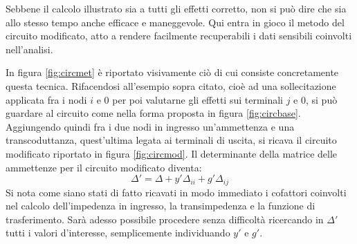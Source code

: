 Sebbene il calcolo illustrato sia a tutti gli effetti corretto, non si può dire che sia allo stesso tempo anche efficace e maneggevole. Qui entra in gioco il metodo del circuito modificato, atto a rendere facilmente recuperabili i dati sensibili coinvolti nell'analisi.

In figura \ref{fig:circmet} è riportato visivamente ciò di cui consiste concretamente questa tecnica. Rifacendosi all'esempio sopra citato, cioè ad una sollecitazione applicata fra i nodi $i$ e $0$ per poi valutarne gli effetti sui terminali $j$ e $0$, si può guardare al circuito come nella forma proposta in figura \ref{fig:circbase}. Aggiungendo quindi fra i due nodi in ingresso un'ammettenza e una transcoduttanza, quest'ultima legata ai terminali di uscita, si ricava il circuito modificato riportato in figura \ref{fig:circmod}. Il determinante della matrice delle ammettenze per il circuito modificato diventa:
$$ \Delta ' = \Delta + y'\Delta_{ii} + g'\Delta_{ij} $$
Si nota come siano stati di fatto ricavati in modo immediato i cofattori coinvolti nel calcolo dell'impedenza in ingresso, la transimpedenza e la funzione di trasferimento. Sarà adesso possibile procedere senza difficoltà ricercando in $\Delta '$ tutti i valori d'interesse, semplicemente individuando $y'$ e $g'$.
